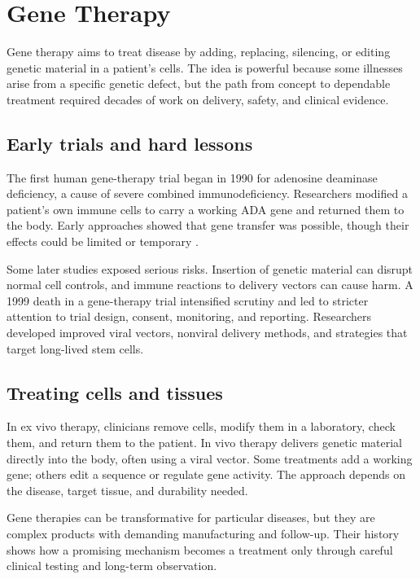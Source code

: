 \documentclass[12pt,oneside]{book}
\begin{document}
\chapter[Gene Therapy]{Gene Therapy}

Gene therapy aims to treat disease by adding, replacing, silencing, or
editing genetic material in a patient's cells. The idea is powerful because
some illnesses arise from a specific genetic defect, but the path from
concept to dependable treatment required decades of work on delivery,
safety, and clinical evidence.

\section{Early trials and hard lessons}
The first human gene-therapy trial began in 1990 for adenosine deaminase
deficiency, a cause of severe combined immunodeficiency. Researchers
modified a patient's own immune cells to carry a working ADA gene and
returned them to the body. Early approaches showed that gene transfer was
possible, though their effects could be limited or temporary
\cite{geneTherapyHistory,adaGeneTherapyTrial}.

Some later studies exposed serious risks. Insertion of genetic material can
disrupt normal cell controls, and immune reactions to delivery vectors can
cause harm. A 1999 death in a gene-therapy trial intensified scrutiny and
led to stricter attention to trial design, consent, monitoring, and reporting.
Researchers developed improved viral vectors, nonviral delivery methods,
and strategies that target long-lived stem cells.

\section{Treating cells and tissues}
In ex vivo therapy, clinicians remove cells, modify them in a laboratory,
check them, and return them to the patient. In vivo therapy delivers genetic
material directly into the body, often using a viral vector. Some treatments
add a working gene; others edit a sequence or regulate gene activity. The
approach depends on the disease, target tissue, and durability needed.

Gene therapies can be transformative for particular diseases, but they are
complex products with demanding manufacturing and follow-up. Their history
shows how a promising mechanism becomes a treatment only through careful
clinical testing and long-term observation.
\end{document}
